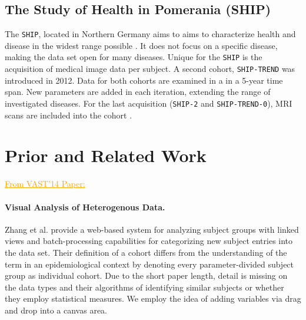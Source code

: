 \documentclass[journal]{style/vgtc} 			          %
\newcommand{\com}[1]{\textcolor{orange}{\uline{#1}}}
\begin{document}
\subsection{The Study of Health in Pomerania (SHIP)}
The \texttt{SHIP}, located in Northern Germany aims to aims to characterize health and disease in the widest range possible \cite{Volzke2011}.
It does not focus on a specific disease, making the data set open for many diseases.
Unique for the \texttt{SHIP} is the acquisition of medical image data per subject.
A second cohort, \texttt{SHIP-TREND} was introduced in 2012.
Data for both cohorts are examined in a in a 5-year time span.
New parameters are added in each iteration, extending the range of investigated diseases.
For the last acquisition (\texttt{SHIP-2} and \texttt{SHIP-TREND-0}), MRI scans are included into the cohort \cite{Hegenscheid2009, Ivanovska2014}.
%
%
%
%
%
%
\section{Prior and Related Work}
\com{From VAST'14 Paper:}
\paragraph{Visual Analysis of Heterogenous Data.}
Zhang et al. \cite{Zhang2012} provide a web-based system for analyzing subject groups with linked views and batch-processing capabilities for categorizing new subject entries into the data set.
%
Their definition of a cohort differs from the understanding of the term in an epidemiological context by denoting every parameter-divided subject group as individual cohort.
%
Due to the short paper length, detail is missing on the data types and their algorithms of identifying similar subjects or whether they employ statistical measures.
%
We employ the idea of adding variables via drag and drop into a canvas area.
\end{document}
